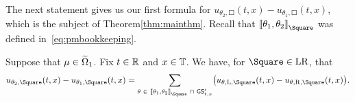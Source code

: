 \documentclass[AHL,Unicode,longabstracts]{cedram}
\newcommand*\GS{\mathsf{GS}}
\newcommand*\TT{\mathbb{T}}
\newcommand*\RR{\mathbb{R}}
\newcommand*\Left{\mathrm{L}}
\newcommand*\Right{\mathrm{R}}
\newcommand*\LR{\mathrm{LR}}
\let\oldin\in
\renewcommand{\in}{\mathchoice{\oldin}{\oldin}{\,\oldin\,}{\,\oldin\,}}
\let\oldcap\cap
\renewcommand{\cap}{\mathchoice{\oldcap}{\oldcap}{\,\oldcap\,}{\,\oldcap\,}}
\newcommand{\llbracket}{\mathopen{[\mkern -2.7mu[}}
\newcommand{\rrbracket}{\mathclose{]\mkern -2.7mu]}}
\newcommand*\TT{\mathbb{T}}
\newcommand*\RR{\mathbb{R}}
\begin{document}
The next statement gives us our first formula for $u_{\theta_{2},\Square}(t,x)-u_{\theta_{1},\Square}(t,x)$, which is the subject of Theorem\ref{thm:mainthm}. Recall that $\llbracket\theta_{1},\theta_{2}\rrbracket_{\Square}$ was defined in~\eqref{eq:pmbookkeeping}.

\begin{prop}\label{prop:differenceintermsoftopology}
Suppose that $\mu\in\widetilde{\Omega}_{1}$. Fix $t\in\RR$ and $x\in\TT$. We have, for $\Square\in\LR$, that
\begin{equation}\label{eq:differenceintermsoftopology}
u_{\theta_{2},\Square}(t,x)-u_{\theta_{1},\Square}(t,x)=\sum_{\theta\in\llbracket\theta_{1},\theta_{2}\rrbracket_{\Square}\cap\GS'_{t,x}}\bigl(u_{\theta,\Left,\Square}(t,x)-u_{\theta,\Right,\Square}(t,x)\bigr).
\end{equation}
\end{prop}
\end{document}
